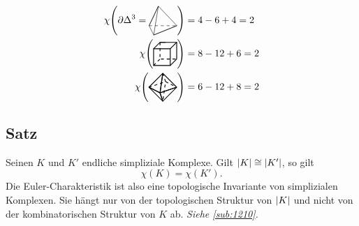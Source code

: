\begin{align*}
	\chi \enbrace*{\partial \Delta^3 = \vcenter{\hbox{\begin{tikzpicture}
			\coordinate (0) at (0,0);
			\coordinate (1) at (1,0);
			\coordinate (2) at (0.5,0,0.866);
			\coordinate (3) at (0.5,0.866,0.433);
			\draw[sharp corners, dashed] (0) -- (1);
			\draw[sharp corners] (1) -- (2) -- (0) -- (3) -- (2) -- (1) -- (3) -- (0);
		\end{tikzpicture}}} } &= 4 - 6 +4 = 2 \\
	\chi\enbrace[\Bigg]{ \vcenter{\hbox{\begin{tikzpicture}
		\coordinate (0) at (0,0,-0.6);
		\coordinate (1) at (0.6,0,-0.6);
		\coordinate (2) at (0.6,0.6,-0.6);
		\coordinate (3) at (0,0.6,-0.6);
		\draw[thick, dashed] (3) -- (0) -- (1);
		\draw[thick] (1) -- (2) -- (3);
		\draw[thick, dashed] (0,0) -- (0);
		\draw[thick] (0.6,0) -- (0.6,0,-0.6);
		\draw[thick] (0.6,0.6) -- (0.6,0.6,-0.6);
		\draw[thick] (0,0.6) -- (0,0.6,-0.6) -- ++ (0.2,0);
		\draw[thick] (0,0) rectangle (0.6,0.6);
	\end{tikzpicture}}} } &= 8 -12 +6 = 2 \\
	\chi \enbrace*{ \vcenter{\hbox{\begin{tikzpicture}
		\coordinate (A1) at (0,0);
		\coordinate (A2) at (0.6,0.2);
		\coordinate (A3) at (1,0);
		\coordinate (A4) at (0.4,-0.2);
		\coordinate (B1) at (0.5,0.5);
		\coordinate (B2) at (0.5,-0.5);
		\begin{scope}[thick,dashed,]
		\draw (A1) -- (A2) -- (A3);
		\draw (B1) -- (A2) -- (B2);
		\end{scope}
		\begin{scope}[thick]
		\draw[] (A1) -- (A4) -- (B1);
		\draw[] (A1) -- (A4) -- (B2);
		\draw[] (A3) -- (A4) -- (B1);
		\draw[] (A3) -- (A4) -- (B2);
		\draw (B1) -- (A1) -- (B2) -- (A3) --cycle;
		\end{scope}
	\end{tikzpicture}}} } &= 6- 12  +8 = 2 
\end{align*}

\subsection[Satz über die Euler-Charakteristik]{Satz} %
\label{sub:210}
Seinen $K$ und $K'$ endliche simpliziale Komplexe. Gilt $\abs*{K} \cong \abs*{K'}$, so gilt 
\[
	\chi(K)= \chi(K').
\]
Die Euler-Charakteristik ist also eine topologische Invariante von simplizialen Komplexen. Sie hängt nur von der topologischen Struktur von $\abs*{K}$ und nicht
von der kombinatorischen Struktur von $K$ ab.
\emph{Siehe \ref{sub:1210}.}
\newpage

